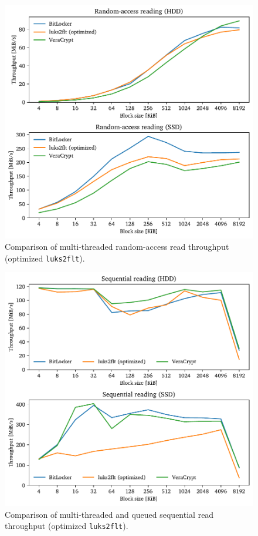 \begin{figure}[htb!]
	\center
	\includegraphics[scale=1]{../fig/performance.results.optrandthreads.pdf}
	\caption[
		Comparison of multi-threaded random-access read throughput (optimized \texttt{luks2flt})
	]{
		Comparison of multi-threaded random-access read throughput (optimized \texttt{luks2flt}). 
	}
	\label{fig:performance.results.optrandthreads}
\end{figure}

\begin{figure}[htb!]
	\center
	\includegraphics[scale=1]{../fig/performance.results.optseqthreadsqueue.pdf}
	\caption[
		Comparison of multi-threaded and queued sequential read throughput (optimized \texttt{luks2flt})
	]{
		Comparison of multi-threaded and queued sequential read throughput (optimized \texttt{luks2flt}). 
	}
	\label{fig:performance.results.optseqthreadsqueue}
\end{figure}

